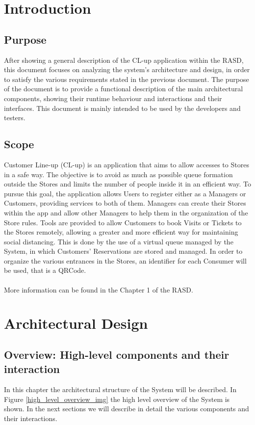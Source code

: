 \documentclass[a4paper, 12pt, oneside, table]{article}
\begin{document}
\normalsize


\newpage
\tableofcontents
\newpage

\section{Introduction}
\subsection{Purpose}
After showing a general description of the CL-up application within the RASD, this document focuses on analyzing the system's architecture and design, in order to satisfy the various requirements stated in the previous document. The purpose of the document is to provide a functional description of the main architectural components, showing their runtime behaviour and interactions and their interfaces. This document is mainly intended to be used by the developers and testers.

\subsection{Scope}
Customer Line-up (CL-up) is an application that aims to allow accesses to Stores in a safe way. The objective is to avoid as much as possible queue formation outside the Stores and limits the number of people inside it in an efficient way. To pursue this goal, the application allows Users to register either as a Managers or Customers, providing services to both of them. Managers can create their Stores within the app and allow other Managers to help them in the organization of the Store rules. Tools are provided to allow Customers to book Visits or Tickets to the Stores remotely, allowing a greater and more efficient way for maintaining social distancing. This is done by the use of a virtual queue managed by the System, in which Customers' Reservations are stored and managed. In order to organize the various entrances in the Stores, an identifier for each Consumer will be used, that is a QRCode.\\ %
\\
More information can be found in the Chapter 1 of the RASD.

\newpage
\section{Architectural Design}
\subsection{Overview: High-level components and their interaction}
In this chapter the architectural structure of the System will be described. In Figure \ref{high_level_overview_img} the high level overview of the System is shown. In the next sections we will describe in detail the various components and their interactions.
\end{document}
